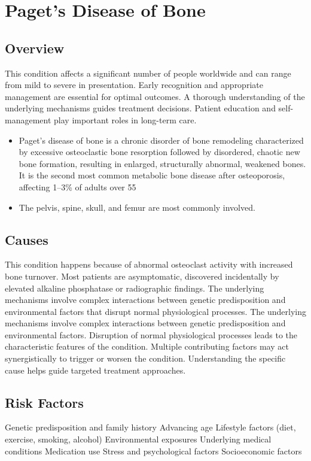 \chapter{Paget's Disease of Bone}
\label{sec:Paget's Disease of Bone}

\section{Overview}
This condition affects a significant number of people worldwide and can range from mild to severe in presentation. Early recognition and appropriate management are essential for optimal outcomes. A thorough understanding of the underlying mechanisms guides treatment decisions. Patient education and self-management play important roles in long-term care.

\begin{itemize}[noitemsep]
  \item Paget's disease of bone is a chronic disorder of bone remodeling characterized by excessive osteoclastic bone resorption followed by disordered, chaotic new bone formation, resulting in enlarged, structurally abnormal, weakened bones. It is the second most common metabolic bone disease after osteoporosis, affecting 1--3\% of adults over 55
  \item The pelvis, spine, skull, and femur are most commonly involved.
\end{itemize}
\section{Causes}
This condition happens because of abnormal osteoclast activity with increased bone turnover. Most patients are asymptomatic, discovered incidentally by elevated alkaline phosphatase or radiographic findings. The underlying mechanisms involve complex interactions between genetic predisposition and environmental factors that disrupt normal physiological processes. The underlying mechanisms involve complex interactions between genetic predisposition and environmental factors. Disruption of normal physiological processes leads to the characteristic features of the condition. Multiple contributing factors may act synergistically to trigger or worsen the condition. Understanding the specific cause helps guide targeted treatment approaches.
\section{Risk Factors}
Genetic predisposition and family history Advancing age Lifestyle factors (diet, exercise, smoking, alcohol) Environmental exposures Underlying medical conditions Medication use Stress and psychological factors Socioeconomic factors

